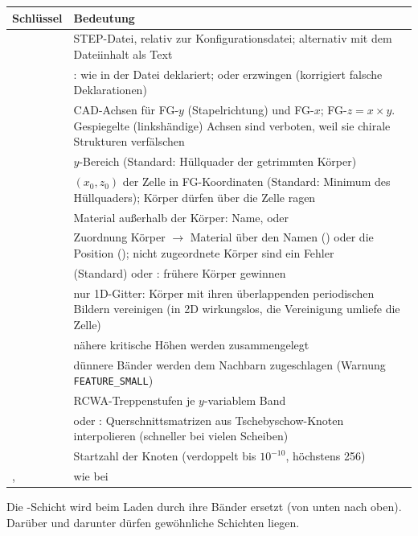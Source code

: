 \begin{center}
\small
\begin{tabularx}{\linewidth}{lY}
\toprule
Schlüssel & Bedeutung \\
\midrule
{} & STEP-Datei, relativ zur Konfigurationsdatei; alternativ  mit dem Dateiinhalt als Text \\
 & : wie in der Datei deklariert;  oder  erzwingen (korrigiert falsche
Deklarationen) \\
 & CAD-Achsen für FG-$y$ (Stapelrichtung) und FG-$x$; FG-$z=x\times y$. Gespiegelte (linkshändige) Achsen
sind verboten, weil sie chirale Strukturen verfälschen \\
 & $y$-Bereich (Standard: Hüllquader der getrimmten Körper) \\
 & $(x_0,z_0)$ der Zelle in FG-Koordinaten (Standard: Minimum des Hüllquaders); Körper dürfen
über die Zelle ragen \\
 & Material außerhalb der Körper: Name,  oder  \\
 & Zuordnung Körper $\to$ Material über den Namen () oder die Position ();
nicht zugeordnete Körper sind ein Fehler \\
 &  (Standard) oder : frühere Körper gewinnen \\
 & nur 1D-Gitter: Körper mit ihren überlappenden periodischen Bildern vereinigen (in 2D wirkungslos,
die Vereinigung umliefe die Zelle) \\
 & nähere kritische Höhen werden zusammengelegt \\
 & dünnere Bänder werden dem Nachbarn zugeschlagen (Warnung \texttt{FEATURE\_SMALL}) \\
 & RCWA-Treppenstufen je $y$-variablem Band \\
 &  oder : Querschnittsmatrizen aus Tschebyschow-Knoten
interpolieren (schneller bei vielen Scheiben) \\
 & Startzahl der Knoten (verdoppelt bis $10^{-10}$, höchstens 256) \\
,  & wie bei  \\
\bottomrule
\end{tabularx}
\end{center}
Die -Schicht wird beim Laden durch ihre Bänder ersetzt (von unten nach oben). Darüber und darunter dürfen
gewöhnliche Schichten liegen.

